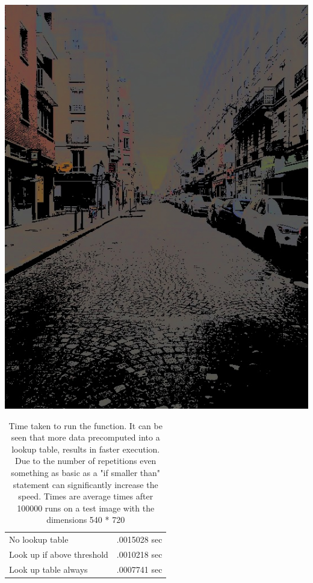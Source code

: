 \begin{center}
\begin{multicols}{2}
\begin{multicols}{2}
		\includegraphics[width=1\linewidth]{figure/Analysis/cityNorm.jpg}
	\end{multicols}
    
    \columnbreak
    
	\begin{table}[H]
		\centering
		\begin{tabular}{ l | l }
			\hline			
			No lookup table & .0015028 sec\\
			Look up if above threshold & .0010218 sec\\
			Look up table always& .0007741 sec\\
			\hline 
		\end{tabular}
	\caption{Time taken to run the function. It can be seen that more data precomputed into a lookup table, results in faster execution. Due to the number of repetitions even something as basic as a "if smaller than" statement can significantly increase the speed. Times are average times after 100000 runs on a test image with the dimensions 540 * 720}
	\label{table:rgConvSpeed}
	\end{table}
	\end{multicols}

\end{center}
